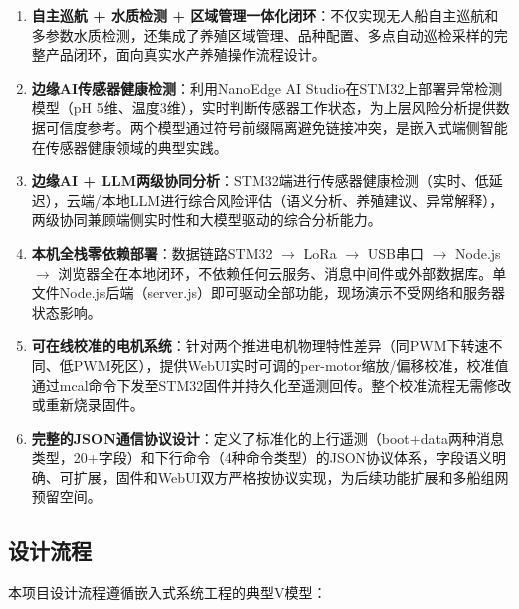 \documentclass[12pt,a4paper]{ctexart}
\begin{document}
\begin{enumerate}[label=\arabic*.]
    \item \textbf{自主巡航 + 水质检测 + 区域管理一体化闭环}：不仅实现无人船自主巡航和多参数水质检测，还集成了养殖区域管理、品种配置、多点自动巡检采样的完整产品闭环，面向真实水产养殖操作流程设计。

    \item \textbf{边缘AI传感器健康检测}：利用NanoEdge AI Studio在STM32上部署异常检测模型（pH 5维、温度3维），实时判断传感器工作状态，为上层风险分析提供数据可信度参考。两个模型通过符号前缀隔离避免链接冲突，是嵌入式端侧智能在传感器健康领域的典型实践。

    \item \textbf{边缘AI + LLM两级协同分析}：STM32端进行传感器健康检测（实时、低延迟），云端/本地LLM进行综合风险评估（语义分析、养殖建议、异常解释），两级协同兼顾端侧实时性和大模型驱动的综合分析能力。

    \item \textbf{本机全栈零依赖部署}：数据链路STM32 $\rightarrow$ LoRa $\rightarrow$ USB串口 $\rightarrow$ Node.js $\rightarrow$ 浏览器全在本地闭环，不依赖任何云服务、消息中间件或外部数据库。单文件Node.js后端（server.js）即可驱动全部功能，现场演示不受网络和服务器状态影响。

    \item \textbf{可在线校准的电机系统}：针对两个推进电机物理特性差异（同PWM下转速不同、低PWM死区），提供WebUI实时可调的per-motor缩放/偏移校准，校准值通过mcal命令下发至STM32固件并持久化至遥测回传。整个校准流程无需修改或重新烧录固件。

    \item \textbf{完整的JSON通信协议设计}：定义了标准化的上行遥测（boot+data两种消息类型，20+字段）和下行命令（4种命令类型）的JSON协议体系，字段语义明确、可扩展，固件和WebUI双方严格按协议实现，为后续功能扩展和多船组网预留空间。
\end{enumerate}

\subsection{设计流程}

本项目设计流程遵循嵌入式系统工程的典型V模型：
\end{document}
